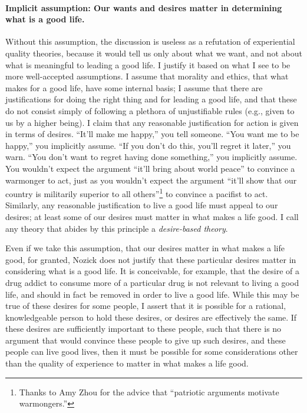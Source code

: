 \documentclass[letterpaper,11pt,twoside]{article}
\begin{document}
    \paragraph{Implicit assumption: Our wants and desires matter in determining what is a good life.}
      Without this assumption, the discussion is useless as a refutation of experiential quality theories, because it would tell us only about what we want, and not about what is meaningful to leading a good life.  I justify it based on what I see to be more well-accepted assumptions.  I assume that morality and ethics, that what makes for a good life, have some internal basis; I assume that there are justifications for doing the right thing and for leading a good life, and that these do not consist simply of following a plethora of unjustifiable rules (e.g., given to us by a higher being).  I claim that any reasonable justification for action is given in terms of desires.  ``It'll make me happy,'' you tell someone.  ``You want me to be happy,'' you implicitly assume.  ``If you don't do this, you'll regret it later,'' you warn.  ``You don't want to regret having done something,'' you implicitly assume.  You wouldn't expect the argument ``it'll bring about world peace'' to convince a warmonger to act, just as you wouldn't expect the argument ``it'll show that our country is militarily superior to all others''\footnote{Thanks to Amy Zhou for the advice that ``patriotic arguments motivate warmongers.''} to convince a pacifist to act.  Similarly, any reasonable justification to live a good life must appeal to our desires; at least some of our desires must matter in what makes a life good.  I call any theory that abides by this principle a \emph{desire-based theory}.

    Even if we take this assumption, that our desires matter in what makes a life good, for granted, Nozick does not justify that these particular desires matter in considering what is a good life.  It is conceivable, for example, that the desire of a drug addict to consume more of a particular drug is not relevant to living a good life, and should in fact be removed in order to live a good life.  While this may be true of these desires for some people, I assert that it is possible for a rational, knowledgeable person to hold these desires, or desires are effectively the same.  If these desires are sufficiently important to these people, such that there is no argument that would convince these people to give up such desires, and these people can live good lives, then it must be possible for some considerations other than the quality of experience to matter in what makes a life good.
\end{document}
